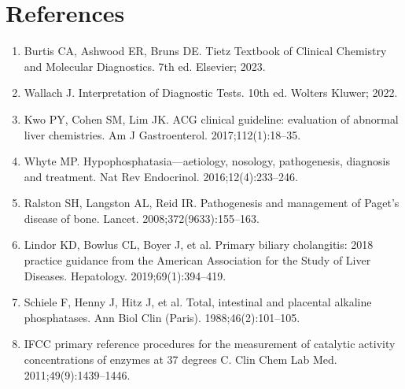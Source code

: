 \section*{References}
\begin{enumerate}
  \item Burtis CA, Ashwood ER, Bruns DE. Tietz Textbook of Clinical Chemistry and Molecular Diagnostics. 7th ed. Elsevier; 2023.
  \item Wallach J. Interpretation of Diagnostic Tests. 10th ed. Wolters Kluwer; 2022.
  \item Kwo PY, Cohen SM, Lim JK. ACG clinical guideline: evaluation of abnormal liver chemistries. Am J Gastroenterol. 2017;112(1):18--35.
  \item Whyte MP. Hypophosphatasia---aetiology, nosology, pathogenesis, diagnosis and treatment. Nat Rev Endocrinol. 2016;12(4):233--246.
  \item Ralston SH, Langston AL, Reid IR. Pathogenesis and management of Paget's disease of bone. Lancet. 2008;372(9633):155--163.
  \item Lindor KD, Bowlus CL, Boyer J, et al. Primary biliary cholangitis: 2018 practice guidance from the American Association for the Study of Liver Diseases. Hepatology. 2019;69(1):394--419.
  \item Schiele F, Henny J, Hitz J, et al. Total, intestinal and placental alkaline phosphatases. Ann Biol Clin (Paris). 1988;46(2):101--105.
  \item IFCC primary reference procedures for the measurement of catalytic activity concentrations of enzymes at 37 degrees C. Clin Chem Lab Med. 2011;49(9):1439--1446.
\end{enumerate}

\clearpage
